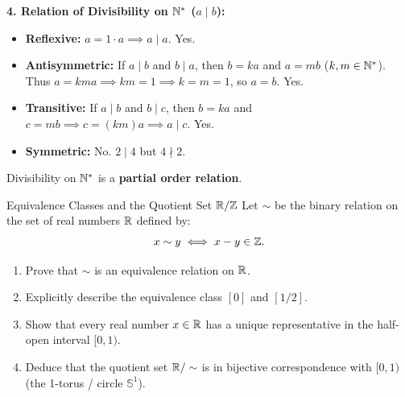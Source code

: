 \begin{solution}
\textbf{4. Relation of Divisibility on $\mathbb{N}^*$ ($a \mid b$):}
\begin{itemize}[leftmargin=1.5em,itemsep=1pt]
  \item \textbf{Reflexive:} $a = 1 \cdot a \implies a \mid a$. Yes.
  \item \textbf{Antisymmetric:} If $a \mid b$ and $b \mid a$, then $b = ka$ and $a = mb$ ($k, m \in \mathbb{N}^*$). Thus $a = km a \implies km = 1 \implies k = m = 1$, so $a = b$. Yes.
  \item \textbf{Transitive:} If $a \mid b$ and $b \mid c$, then $b = k a$ and $c = m b \implies c = (km)a \implies a \mid c$. Yes.
  \item \textbf{Symmetric:} No. $2 \mid 4$ but $4 \nmid 2$.
\end{itemize}
Divisibility on $\mathbb{N}^*$ is a \textbf{partial order relation}.
\end{solution}

\begin{exercise}{Equivalence Classes and the Quotient Set $\mathbb{R}/\mathbb{Z}$}
Let $\sim$ be the binary relation on the set of real numbers $\mathbb{R}$ defined by:
\[
x \sim y \iff x - y \in \mathbb{Z}.
\]
\begin{enumerate}[leftmargin=1.5em,itemsep=2pt]
  \item Prove that $\sim$ is an equivalence relation on $\mathbb{R}$.
  \item Explicitly describe the equivalence class $[0]$ and $[1/2]$.
  \item Show that every real number $x \in \mathbb{R}$ has a unique representative in the half-open interval $[0, 1)$.
  \item Deduce that the quotient set $\mathbb{R}/\sim$ is in bijective correspondence with $[0, 1)$ (the 1-torus / circle $\mathbb{S}^1$).
\end{enumerate}
\end{exercise}

\begin{tabletworkspace}[5.0cm]
\end{tabletworkspace}

